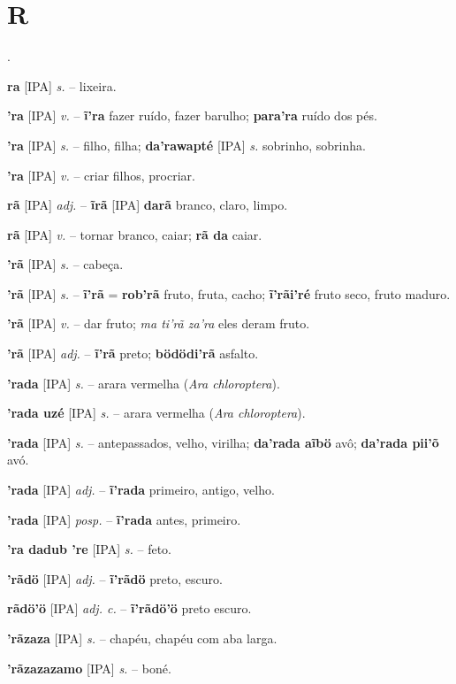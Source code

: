 \section*{R}.



\textbf{ra} [IPA] \textit{s.} -- lixeira.

\textbf{'ra} [IPA] \textit{v.} -- \textbf{ĩ'ra} fazer ruído, fazer barulho; \textbf{para'ra} ruído dos pés.

\textbf{'ra} [IPA] \textit{s.} -- filho, filha; \textbf{da'rawapté} [IPA] \textit{s.} sobrinho, sobrinha.

\textbf{'ra} [IPA] \textit{v.} -- criar filhos, procriar.

\textbf{rã} [IPA] \textit{adj.} -- \textbf{ĩrã} [IPA] \textbf{darã} branco, claro, limpo.

\textbf{rã} [IPA] \textit{v.} -- tornar branco, caiar; \textbf{rã da} caiar.

\textbf{'rã} [IPA] \textit{s.} -- cabeça.

\textbf{'rã} [IPA] \textit{s.} -- \textbf{ĩ'rã} = \textbf{rob'rã} fruto, fruta, cacho; \textbf{ĩ'rãi'ré} fruto seco, fruto maduro.

\textbf{'rã} [IPA] \textit{v.} -- dar fruto; \textit{ma ti'rã za'ra} eles deram fruto.

\textbf{'rã} [IPA] \textit{adj.} -- \textbf{ĩ'rã} preto; \textbf{bödödi'rã} asfalto.

\textbf{'rada} [IPA] \textit{s.} -- arara vermelha (\textit{Ara chloroptera}).

\textbf{'rada uzé} [IPA] \textit{s.} -- arara vermelha (\textit{Ara chloroptera}).

\textbf{'rada} [IPA] \textit{s.} -- antepassados, velho, virilha; \textbf{da'rada aĩbö} avô; \textbf{da'rada pii'õ} avó.

\textbf{'rada} [IPA] \textit{adj.} -- \textbf{ĩ'rada} primeiro, antigo, velho.

\textbf{'rada} [IPA] \textit{posp.} -- \textbf{ĩ'rada} antes, primeiro.

\textbf{'ra dadub 're} [IPA] \textit{s.} -- feto.

\textbf{'rãdö} [IPA] \textit{adj.} -- \textbf{ĩ'rãdö} preto, escuro.

\textbf{rãdö'ö} [IPA] \textit{adj. c.} -- \textbf{ĩ'rãdö'ö} preto escuro.

\textbf{'rãzaza} [IPA] \textit{s.} -- chapéu, chapéu com aba larga.

\textbf{'rãzazazamo} [IPA] \textit{s.} -- boné.

